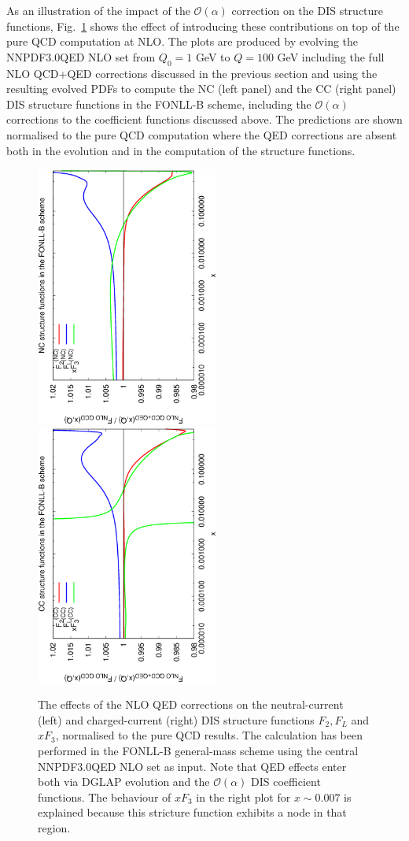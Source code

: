 As an illustration of the impact of the $\mathcal{O}(\alpha)$
correction on the DIS structure functions, Fig.~\ref{fig:StructFuncs}
shows the effect of introducing these contributions on top of the pure
QCD computation at NLO.
%
The plots are produced by evolving the
NNPDF3.0QED NLO set from $Q_0=1$ GeV to $Q=100$ GeV including the full
NLO QCD+QED corrections discussed in the previous section and using
the resulting evolved PDFs to compute the NC (left panel) and the CC
(right panel) DIS structure functions in the FONLL-B scheme, including
the $\mathcal{O}(\alpha)$ corrections to the coefficient functions
discussed above.
%
The predictions are shown normalised to the pure QCD computation where
the QED corrections are absent both in the evolution and in the
computation of the structure functions.

\begin{figure}[t]
\includegraphics[width=6cm,angle=270]{figs/NLOQEDCorrections_NC.eps}
\includegraphics[width=6cm,angle=270]{figs/NLOQEDCorrections_CC.eps}
\caption{The effects of the NLO QED corrections on the neutral-current
(left) and charged-current (right) DIS structure functions
$F_2, F_L$ and $xF_3$, normalised to the pure QCD results.
%
The calculation has been performed in the FONLL-B general-mass scheme using the
central NNPDF3.0QED NLO
set as input.
%
Note that QED effects enter both via DGLAP evolution and the
$\mathcal{O}(\alpha)$ DIS coefficient functions.
%
The behaviour of $xF_3$ in the right plot for $x\sim 0.007$ is explained
because this stricture function exhibits a node in that region.
}
\label{fig:StructFuncs}
\end{figure}
